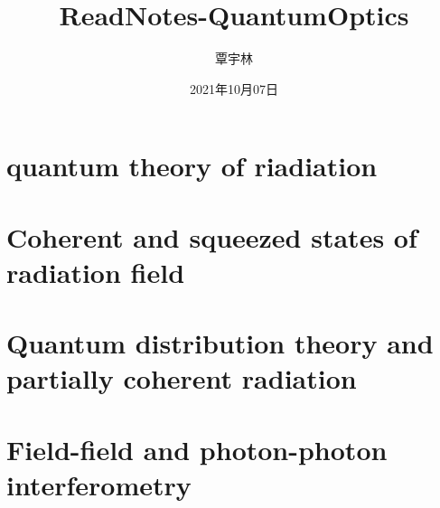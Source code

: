 








\setlength{\droptitle}{-2cm}
\pretitle{\begin{center}\LARGE\sffamily}
\title{ReadNotes-QuantumOptics}
\posttitle{\par\end{center}\vspace{-0.3cm}}
\preauthor{\large}
\DeclareRobustCommand{\authorthing}
{
\begin{center}
\begin{tabular}{c}%
覃宇林\\
\end{tabular}
\end{center}
}
\author{\authorthing}
\postauthor{}
\predate{\begin{center}\large\scshape}
\date{2021年10月07日}
\postdate{\par\end{center}}


\frontpagestyle
\maketitle
{}
\tableofcontents\newpage
{}
\mainpagestyle
\setcounter{page}{1}

\section{quantum theory of riadiation}


\section{Coherent and squeezed states of radiation field}


\section{Quantum distribution theory and partially coherent radiation}


\section{Field-field and photon-photon interferometry}


